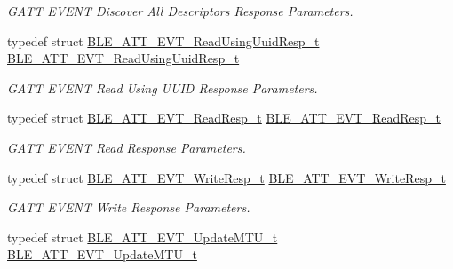 \begin{DoxyCompactItemize}
\begin{DoxyCompactList}\small\item\em G\+A\+TT E\+V\+E\+NT Discover All Descriptors Response Parameters. \end{DoxyCompactList}\item 
typedef struct \hyperlink{struct_b_l_e___a_t_t___e_v_t___read_using_uuid_resp__t}{B\+L\+E\+\_\+\+A\+T\+T\+\_\+\+E\+V\+T\+\_\+\+Read\+Using\+Uuid\+Resp\+\_\+t} \hyperlink{group___b_l_e___g_a_t_t_gacd99d520d9b10e39a33a062b1d275371}{B\+L\+E\+\_\+\+A\+T\+T\+\_\+\+E\+V\+T\+\_\+\+Read\+Using\+Uuid\+Resp\+\_\+t}\hypertarget{group___b_l_e___g_a_t_t_gacd99d520d9b10e39a33a062b1d275371}{}\label{group___b_l_e___g_a_t_t_gacd99d520d9b10e39a33a062b1d275371}

\begin{DoxyCompactList}\small\item\em G\+A\+TT E\+V\+E\+NT Read Using U\+U\+ID Response Parameters. \end{DoxyCompactList}\item 
typedef struct \hyperlink{struct_b_l_e___a_t_t___e_v_t___read_resp__t}{B\+L\+E\+\_\+\+A\+T\+T\+\_\+\+E\+V\+T\+\_\+\+Read\+Resp\+\_\+t} \hyperlink{group___b_l_e___g_a_t_t_ga9c26ee141318df75c242d46bbc0e388d}{B\+L\+E\+\_\+\+A\+T\+T\+\_\+\+E\+V\+T\+\_\+\+Read\+Resp\+\_\+t}\hypertarget{group___b_l_e___g_a_t_t_ga9c26ee141318df75c242d46bbc0e388d}{}\label{group___b_l_e___g_a_t_t_ga9c26ee141318df75c242d46bbc0e388d}

\begin{DoxyCompactList}\small\item\em G\+A\+TT E\+V\+E\+NT Read Response Parameters. \end{DoxyCompactList}\item 
typedef struct \hyperlink{struct_b_l_e___a_t_t___e_v_t___write_resp__t}{B\+L\+E\+\_\+\+A\+T\+T\+\_\+\+E\+V\+T\+\_\+\+Write\+Resp\+\_\+t} \hyperlink{group___b_l_e___g_a_t_t_gae879d12f09852da722312f669677ee1b}{B\+L\+E\+\_\+\+A\+T\+T\+\_\+\+E\+V\+T\+\_\+\+Write\+Resp\+\_\+t}\hypertarget{group___b_l_e___g_a_t_t_gae879d12f09852da722312f669677ee1b}{}\label{group___b_l_e___g_a_t_t_gae879d12f09852da722312f669677ee1b}

\begin{DoxyCompactList}\small\item\em G\+A\+TT E\+V\+E\+NT Write Response Parameters. \end{DoxyCompactList}\item 
typedef struct \hyperlink{struct_b_l_e___a_t_t___e_v_t___update_m_t_u__t}{B\+L\+E\+\_\+\+A\+T\+T\+\_\+\+E\+V\+T\+\_\+\+Update\+M\+T\+U\+\_\+t} \hyperlink{group___b_l_e___g_a_t_t_gabfd224d40e0b06789bc49955fd91d123}{B\+L\+E\+\_\+\+A\+T\+T\+\_\+\+E\+V\+T\+\_\+\+Update\+M\+T\+U\+\_\+t}\hypertarget{group___b_l_e___g_a_t_t_gabfd224d40e0b06789bc49955fd91d123}{}\label{group___b_l_e___g_a_t_t_gabfd224d40e0b06789bc49955fd91d123}


\end{DoxyCompactItemize}
